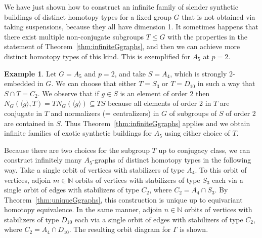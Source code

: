 \documentclass[12pt]{amsart}
\theoremstyle{plain}
\theoremstyle{definition}
\newtheorem{example}[theorem]{Example}
\theoremstyle{remark}
\numberwithin{equation}{section}
\def\NN{{\mathbb N}}
\begin{document}
We have just shown how to construct an infinite family of slender synthetic buildings of distinct homotopy types for a fixed group $G$ that is not obtained via taking suspensions, because they all have dimension 1.
It sometimes happens that there exist multiple non-conjugate subgroups $T\leq G$ with the properties in the statement of Theorem~\ref{thm:infiniteGgraphs}, and then we can achieve more distinct homotopy types of this kind. This is exemplified for $A_5$ at $p=2$.

\begin{example}
\label{a5-families-example}
    Let $G=A_5$ and $p=2$, and take $S=A_4$, which is strongly 2-embedded in $G$. We can choose that either $T=S_3$ or $T=D_{10}$ in such a way that $S\cap T=C_2$. We observe that if $g\in S$ is an element of order 2 then $N_G(\langle g \rangle, T) = TN_G(\langle g\rangle)\subseteq TS$ because all elements of order 2 in $T$ are conjugate in $T$ and normalizers (= centralizers) in $G$ of subgroups of $S$ of order 2 are contained in $S$.
    Thus Theorem~\ref{thm:infiniteGgraphs} applies and we obtain infinite families of exotic synthetic buildings for $A_5$ using either choice of $T$. 

    Because there are two choices for the subgroup $T$ up to conjugacy class, we can construct infinitely many $A_5$-graphs of distinct homotopy types in the following way. Take a single orbit of vertices with stabilizers of type $A_4$. To this orbit of vertices, adjoin $m\in\NN$ orbits of vertices with stabilizers of type $S_3$ each via a single orbit of edges with stabilizers of type $C_2$, where $C_2=A_4\cap S_3$. By Theorem~\ref{thm:uniqueGgraphs}, this construction is unique up to equivariant homotopy equivalence. In the same manner, adjoin $n\in\NN$ orbits of vertices with stabilizers of type $D_{10}$ each via a single orbit of edges with stabilizers of type $C_2$, where $C_2=A_4\cap D_{10}$. The resulting orbit diagram for $\Gamma$ is shown. %
    

\end{example}
\end{document}
